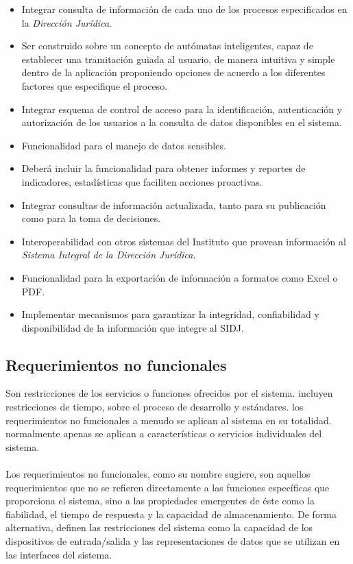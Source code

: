 \documentclass[../reportesINE.tex]{subfiles}
\begin{document}
\begin{itemize}
\item Integrar consulta de información de cada uno de los procesos especificados en la \textit{Dirección Jurídica}. \\
\item Ser construido sobre un concepto de autómatas inteligentes, capaz de establecer una tramitación guiada al usuario, de manera intuitiva y simple dentro de la aplicación proponiendo opciones de acuerdo a los diferentes factores que especifique el proceso. \\
\item Integrar esquema de control de acceso para la identificación, autenticación y autorización de los usuarios a la consulta de datos disponibles en el sistema. \\
\item Funcionalidad para el manejo de datos sensibles. \\
\item Deberá incluir la funcionalidad para obtener informes y reportes de indicadores, estadísticas que faciliten acciones proactivas. 
\item Integrar consultas de información actualizada, tanto para su publicación como para la toma de decisiones. \\
\item Interoperabilidad con otros sistemas del Instituto que provean información al \textit{Sistema Integral de la Dirección Jurídica}. \\
\item Funcionalidad para la exportación de información a formatos como Excel o PDF. \\
\item Implementar mecanismos para garantizar la integridad, confiabilidad y disponibilidad de la información que integre al SIDJ.
\end{itemize}

\subsection{Requerimientos no funcionales}
Son restricciones de los servicios o funciones ofrecidos por el sistema. incluyen restricciones de tiempo, sobre el proceso de desarrollo y estándares. los requerimientos no funcionales a menudo se aplican al sistema en su totalidad. normalmente apenas se aplican a características o servicios individuales del sistema.  \\ \\
Los requerimientos no funcionales, como su nombre sugiere, son aquellos requerimientos que no se refieren directamente a las funciones específicas que proporciona el sistema, sino a las propiedades emergentes de éste como la fiabilidad, el tiempo de respuesta y la capacidad de almacenamiento. De forma alternativa, definen las restricciones del sistema como la capacidad de los dispositivos de entrada/salida y las representaciones de datos que se utilizan en las interfaces del sistema. 
\end{document}
